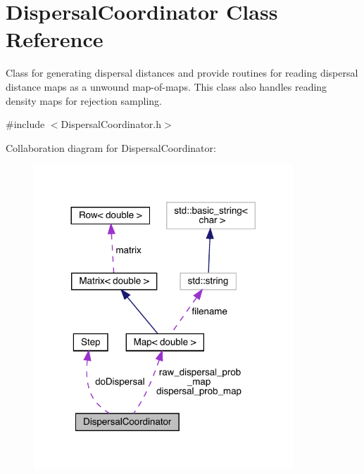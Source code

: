 \hypertarget{class_dispersal_coordinator}{}\section{Dispersal\+Coordinator Class Reference}
\label{class_dispersal_coordinator}


Class for generating dispersal distances and provide routines for reading dispersal distance maps as a unwound map-\/of-\/maps. This class also handles reading density maps for rejection sampling.  




{\ttfamily \#include $<$Dispersal\+Coordinator.\+h$>$}



Collaboration diagram for Dispersal\+Coordinator\+:
\nopagebreak
\begin{figure}[H]
\begin{center}
\leavevmode
\includegraphics[width=276pt]{class_dispersal_coordinator__coll__graph}
\end{center}
\end{figure}
